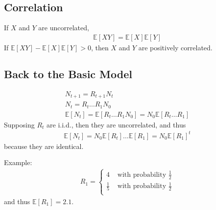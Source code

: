 \documentclass{article}
\newcommand{\expectation}{\mathbb{E}}
\begin{document}
            \subsection{Correlation}
                If $X$ and $Y$ are uncorrelated,
                \begin{align}
                    \expectation[XY] = \expectation[X]\expectation[Y]
                \end{align}
                If $\expectation[XY] - \expectation[X]\expectation[Y] > 0$, then $X$ and $Y$ are positively correlated.

        \subsection{Back to the Basic Model}
            \begin{align}
                N_{t+1} = R_{t+1}N_t \\
                N_t = R_t\dots R_1 N_0 \\
                \expectation[N_t] = \expectation[R_t\dots R_1 N_0] = N_0\expectation[R_t\dots R_1]
            \end{align}
            Supposing $R_t$ are i.i.d., then they are uncorrelated, and thus
            \begin{align}
                \expectation[N_t] = N_0\expectation[R_t]\dots\expectation[R_1] = N_0\expectation[R_1]^t
            \end{align}
            because they are identical.

            Example:
            \begin{align}
                R_1 = \begin{cases}
                    4 & \text{ with probability } \frac{1}{2} \\
                    \frac{1}{5} & \text{ with probability } \frac{1}{2} \\
                \end{cases}
            \end{align}
            and thus $\expectation[R_1] = 2.1$.
\end{document}
